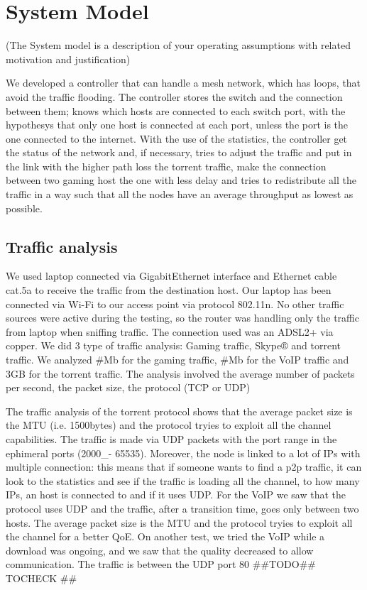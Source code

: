 \documentclass[conference,10pt]{IEEEtran}
\begin{document}
\section{System Model}\label{sec:symo}
(The System model is a description of your operating assumptions with related motivation and justification)


We developed a controller that can handle a mesh network, which has loops, that avoid
the traffic flooding. The controller stores the switch and the connection between them;
knows which hosts are connected to each switch port, with the hypothesys that only one
host is connected at each port, unless the port is the one connected to the internet.
With the use of the statistics, the controller get the status of the network and, if necessary,
tries to adjust the traffic and put in the link with the higher path loss the torrent traffic,
make the connection between two gaming host the one with less delay and tries to redistribute all the traffic in a way
such that all the nodes have an average throughput as lowest as possible.


\subsection{Traffic analysis}\label{sec:traf}
We used laptop connected via
GigabitEthernet interface and Ethernet cable cat.5a to receive the traffic from the destination host.
Our laptop has been connected via Wi-Fi to our access point via protocol 802.11n.
No other traffic sources were active during the testing, so the router was handling only
the traffic from laptop when sniffing traffic. The connection used was an ADSL2+ via copper.
We did 3 type of traffic analysis: Gaming traffic, Skype® and torrent traffic. We analyzed
\#Mb for the gaming traffic, \#Mb for the VoIP traffic and 3GB for the torrent traffic.
The analysis involved the average number of packets per second, the packet size, the protocol (TCP or UDP)

The traffic analysis of the torrent protocol shows that the average packet size is the MTU
(i.e. 1500bytes) and the protocol tryies to exploit all the channel capabilities. The traffic
is made via UDP packets with the port range in the ephimeral ports (2000_- 65535).
Moreover, the node is linked to a lot of IPs with multiple connection: this means that
if someone wants to find a p2p traffic, it can look to the statistics and see if the traffic is loading all the channel,
to how many IPs, an host is connected to and if it uses UDP.
For the VoIP we saw that the protocol uses UDP and the traffic, after a transition time, goes only between two hosts.
The average packet size is the MTU and the protocol tryies to exploit all the channel for a better QoE.
On another test, we tried the VoIP while a download was ongoing, and we saw that the quality
decreased to allow communication. The traffic is between the UDP port 80 \#\#TODO\#\# TOCHECK \#\#
\end{document}
